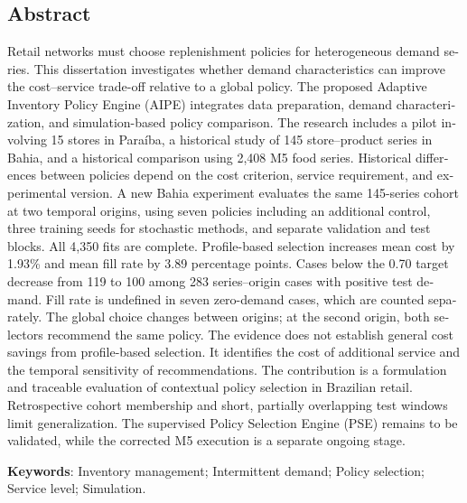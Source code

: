 \begin{otherlanguage}{english}
\chapter*{\centering Abstract}
Retail networks must choose replenishment policies for heterogeneous demand series. This dissertation investigates whether demand characteristics can improve the cost--service trade-off relative to a global policy. The proposed Adaptive Inventory Policy Engine (AIPE) integrates data preparation, demand characterization, and simulation-based policy comparison. The research includes a pilot involving 15 stores in Paraíba, a historical study of 145 store--product series in Bahia, and a historical comparison using 2,408 M5 food series. Historical differences between policies depend on the cost criterion, service requirement, and experimental version. A new Bahia experiment evaluates the same 145-series cohort at two temporal origins, using seven policies including an additional control, three training seeds for stochastic methods, and separate validation and test blocks. All 4,350 fits are complete. Profile-based selection increases mean cost by 1.93\% and mean fill rate by 3.89 percentage points. Cases below the 0.70 target decrease from 119 to 100 among 283 series--origin cases with positive test demand. Fill rate is undefined in seven zero-demand cases, which are counted separately. The global choice changes between origins; at the second origin, both selectors recommend the same policy. The evidence does not establish general cost savings from profile-based selection. It identifies the cost of additional service and the temporal sensitivity of recommendations. The contribution is a formulation and traceable evaluation of contextual policy selection in Brazilian retail. Retrospective cohort membership and short, partially overlapping test windows limit generalization. The supervised Policy Selection Engine (PSE) remains to be validated, while the corrected M5 execution is a separate ongoing stage.

\vspace{2em}
\textbf{Keywords}: Inventory management; Intermittent demand; Policy selection; Service level; Simulation.
\end{otherlanguage}
